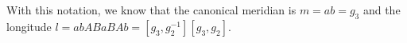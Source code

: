 With this notation, we know \cite{Thurston} that the canonical meridian is $m=ab=g_3$ and the longitude 
$l=abABaBAb=[g_3,g_2^{-1}][g_3,g_2]$.




